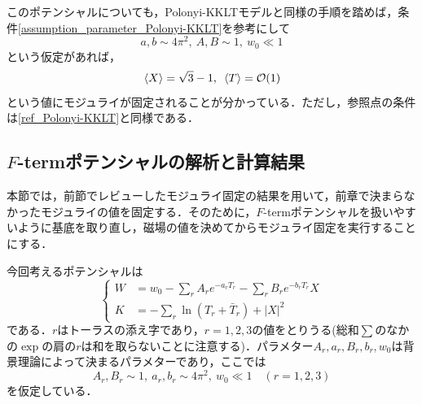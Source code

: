 \documentclass[a4paper,uplatex,dvipdfmx]{jsarticle}
\theoremstyle{definition}
\begin{document}
このポテンシャルについても，Polonyi-KKLTモデルと同様の手順を踏めば，条件\eqref{assumption_parameter_Polonyi-KKLT}を参考にして
\begin{equation}
   a,b\sim 4\pi^2 
   ,\ 
   A,B\sim 1
   ,\ 
   w_{0}\ll 1
   \label{assumption_parameter_now_rev}
\end{equation}
という仮定があれば，
\begin{equation}
   \ev*{X}
   =
   \sqrt{3}-1
   ,\ 
   \ev*{T}
   =
   \mathcal{O}(1)
   \label{VEV_reference_point}
\end{equation}
という値にモジュライが固定されることが分かっている\cite{Abe_MoreFterm_2007a}．ただし，参照点の条件は\eqref{ref_Polonyi-KKLT}と同様である．


\subsection{\texorpdfstring{$F$}{F}-termポテンシャルの解析と計算結果}

本節では，前節でレビューしたモジュライ固定の結果を用いて，前章で決まらなかったモジュライの値を固定する．そのために，$F$-termポテンシャルを扱いやすいように基底を取り直し，磁場の値を決めてからモジュライ固定を実行することにする．

今回考えるポテンシャルは
\begin{equation}
   \left\{
      \begin{alignedat}{1}
         W
         &=
         w_{0}
         -
         \sum_{r}A_{r}e^{-a_{r}T_{r}}
         -
         \sum_{r}B_{r}e^{-b_{r}T_{r}}X
         \\
         K
         &=
         -
         \sum_{r}\ln(T_{r}+\bar{T}_{r})
         +
         |X|^2
      \end{alignedat}
   \right.
   \label{potential_now_before}
\end{equation}
である．$r$はトーラスの添え字であり，$r=1,2,3$の値をとりうる(総和$\sum$のなかの$\exp$の肩の$r$は和を取らないことに注意する)．パラメター$A_{r},a_{r},B_{r},b_{r},w_{0}$は背景理論によって決まるパラメターであり，ここでは
\begin{equation}
   A_{r},B_{r}\sim 1
   ,\ 
   a_{r},b_{r}\sim 4\pi^2  
   ,\ 
   w_{0}\ll 1
   \quad
   (r=1,2,3)
   \label{assumption_parameter_now}
\end{equation}
を仮定している．
\end{document}
